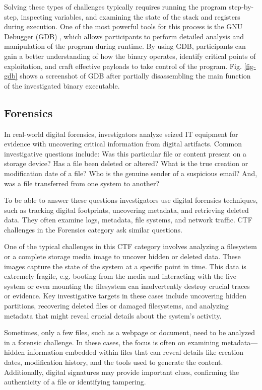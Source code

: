 \documentclass[conference]{IEEEtran}
\begin{document}
Solving these types of challenges typically requires running the program
step-by-step, inspecting variables, and examining the state of the stack and
registers during execution. One of the most powerful tools for this process is
the GNU Debugger (GDB)
\cite{stallman1988},
which allows participants to perform detailed analysis and manipulation of
the program during runtime. By using GDB, participants can gain a better
understanding of how the binary operates, identify critical points of
exploitation, and craft effective payloads to take control of the program.
Fig. \ref{fig-gdb} shows a screenshot of GDB after partially disassembling
the main function of the investigated binary executable.

\subsection{Forensics}

In real-world digital forensics, investigators analyze seized IT
equipment for evidence
with uncovering critical information from digital artifacts.
Common investigative questions include: Was this particular file or content
present on a storage device? Has a file been deleted or altered? What is the
true creation or modification date of a file? Who is the genuine sender of a
suspicious email? And, was a file transferred from one system to another?

To be able to answer these questions investigators use digital forensics techniques,
such as tracking digital
footprints, uncovering metadata, and retrieving deleted data. They often
examine logs, metadata, file systems, and network traffic.
CTF challenges in the Forensics category ask similar questions.

One of the typical challenges in this CTF category involves analyzing a
filesystem or a complete storage media image to uncover hidden or deleted data.
These images capture the state of the system at a specific point in time.
This data is extremely
fragile, e.g. booting from the media and interacting with the live system or
even mounting the filesystem can inadvertently destroy crucial
traces or evidence.
Key investigative targets in these cases include uncovering hidden partitions,
recovering deleted files or damaged filesystems, and analyzing metadata that might reveal crucial
details about the system's activity.

Sometimes, only a few files, such as a webpage or document, need to be analyzed
in a forensic challenge. In these cases, the focus is often on examining
metadata—hidden information embedded within files that can reveal details like
creation dates, modification history, and the tools used to generate the
content. Additionally, digital signatures may provide important clues,
confirming the authenticity of a file or identifying tampering.
\end{document}
